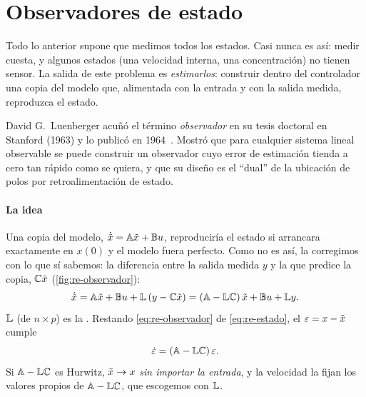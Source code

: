 \section{Observadores de estado}
\label{sec:re-observador}

Todo lo anterior supone que medimos todos los estados. Casi nunca es así: medir cuesta, y algunos estados (una velocidad interna, una concentración) no tienen sensor. La salida de este problema es \emph{estimarlos}: construir dentro del controlador una copia del modelo que, alimentada con la entrada y con la salida medida, reproduzca el estado.

\begin{historia}
David G.\ Luenberger acuñó el término \emph{observador} en su tesis doctoral en Stanford (1963) y lo publicó en 1964~\citep{Lue64}. Mostró que para cualquier sistema lineal observable se puede construir un observador cuyo error de estimación tienda a cero tan rápido como se quiera, y que su diseño es el ``dual'' de la ubicación de polos por retroalimentación de estado.
\end{historia}

\paragraph{La idea}
Una copia del modelo, $\dot{\tilde{x}}=\mathbb{A}\tilde{x}+\mathbb{B} u$, reproduciría el estado si arrancara exactamente en $x(0)$ y el modelo fuera perfecto. Como no es así, la corregimos con lo que sí sabemos: la diferencia entre la salida medida $y$ y la que predice la copia, $\mathbb{C}\tilde{x}$ (\cref{fig:re-observador}):
\begin{equation}
  \dot{\tilde{x}}=\mathbb{A}\tilde{x}+\mathbb{B} u+\mathbb{L}\,(y-\mathbb{C}\tilde{x})=(\mathbb{A}-\mathbb{L}\mathbb{C})\,\tilde{x}+\mathbb{B} u+\mathbb{L} y.
  \label{eq:re-observador}
\end{equation}
$\mathbb{L}$ (de $n\times p$) es la . Restando \eqref{eq:re-observador} de \eqref{eq:re-estado}, el  $\varepsilon=x-\tilde{x}$ cumple
\begin{equation}
  \dot{\varepsilon}=(\mathbb{A}-\mathbb{L}\mathbb{C})\,\varepsilon.
  \label{eq:re-errorobs}
\end{equation}
Si $\mathbb{A}-\mathbb{L}\mathbb{C}$ es Hurwitz, $\tilde{x}\to x$ \emph{sin importar la entrada}, y la velocidad la fijan los valores propios de $\mathbb{A}-\mathbb{L}\mathbb{C}$, que escogemos con $\mathbb{L}$.

